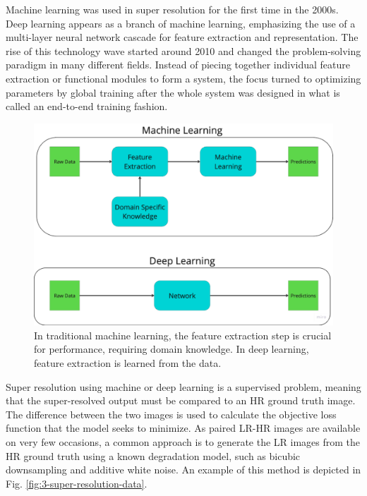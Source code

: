     Machine learning was used in super resolution for the first time in the 2000s. 
    Deep learning appears as a branch of machine learning, emphasizing the use of a multi-layer neural network cascade for feature extraction and representation. 
    The rise of this technology wave started around 2010 and changed the problem-solving paradigm in many different fields.
    Instead of piecing together individual feature extraction or functional modules to form a system, the focus turned to optimizing parameters by global training after the whole system was designed in what is called an end-to-end training fashion.

    \begin{figure}[H]
        \centering
        \includegraphics[width=\textwidth]{Includes/2-end-to-end-training.pdf}
        \caption{In traditional machine learning, the feature extraction step is crucial for performance, requiring domain knowledge. In deep learning, feature extraction is learned from the data.}
        \label{fig:2-end-to-end-training}
    \end{figure}

    Super resolution using machine or deep learning is a supervised problem, meaning that the super-resolved output must be compared to an HR ground truth image. 
    The difference between the two images is used to calculate the objective loss function that the model seeks to minimize.
    As paired LR-HR images are available on very few occasions, a common approach is to generate the LR images from the HR ground truth using a known degradation model, such as bicubic downsampling and additive white noise. An example of this method is depicted in Fig. \ref{fig:3-super-resolution-data}. 
    
